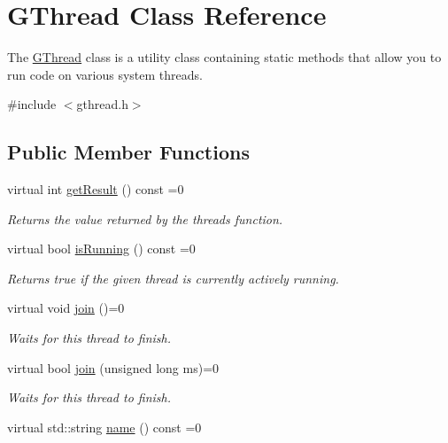 \hypertarget{classsgl_1_1GThread}{}\section{G\+Thread Class Reference}
\label{classsgl_1_1GThread}


The \mbox{\hyperlink{classsgl_1_1GThread}{G\+Thread}} class is a utility class containing static methods that allow you to run code on various system threads.  




{\ttfamily \#include $<$gthread.\+h$>$}

\subsection*{Public Member Functions}
\begin{DoxyCompactItemize}
\item 
virtual int \mbox{\hyperlink{classsgl_1_1GThread_a6cfc0f4e3b2174fde084cd1865f2c9e9}{get\+Result}} () const =0
\begin{DoxyCompactList}\small\item\em Returns the value returned by the thread\textquotesingle{}s function. \end{DoxyCompactList}\item 
virtual bool \mbox{\hyperlink{classsgl_1_1GThread_aff473089d979b1e6bab44a61504a0be9}{is\+Running}} () const =0
\begin{DoxyCompactList}\small\item\em Returns true if the given thread is currently actively running. \end{DoxyCompactList}\item 
virtual void \mbox{\hyperlink{classsgl_1_1GThread_a93870341d2cd3467df4f193375354be8}{join}} ()=0
\begin{DoxyCompactList}\small\item\em Waits for this thread to finish. \end{DoxyCompactList}\item 
virtual bool \mbox{\hyperlink{classsgl_1_1GThread_aeaa664c96a0ace02d44fc791725550a2}{join}} (unsigned long ms)=0
\begin{DoxyCompactList}\small\item\em Waits for this thread to finish. \end{DoxyCompactList}\item 
virtual std\+::string \mbox{\hyperlink{classsgl_1_1GThread_a7f04e718c6856c4d3d77a496b6acad0d}{name}} () const =0

\end{DoxyCompactItemize}
